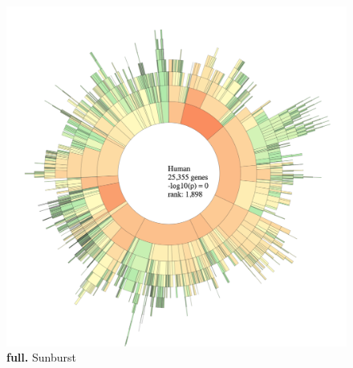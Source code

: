 \documentclass[11pt]{article}
\begin{document}
\begin{figure}[htp]
\begin{center}
\includegraphics[width=0.96\linewidth,clip]{./img/full_sunburst.png}
\caption{\label{fig:full_sunburst} {\bf full.} Sunburst}
\end{center}
\end{figure}
\end{document}
